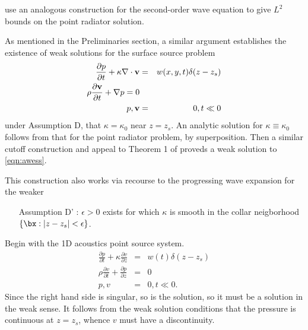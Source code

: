 \cite{SantosaSymes:00} use an analogous construction for the
second-order wave equation to give $L^2$ bounds on the point radiator
solution.

As mentioned in the Preliminaries section, a similar argument
establishes the existence of weak solutions for the surface source problem
\begin{eqnarray}
\label{eqn:awess}
\frac{\partial p}{\partial t} + \kappa \nabla \cdot {\bf v} &=&
                                                                w(x,y,t)\delta(z-z_s) \nonumber\\
\rho \frac{\partial {\bf v}}{\partial t} + \nabla p = 0 \nonumber\\
p,{\bf v}&=&0, t \ll 0
\end{eqnarray}
under Assumption D, that $\kappa=\kappa_0$ near $z=z_s$. An analytic
solution for $\kappa \equiv \kappa_0$ follows from that for the point
radiator problem, by superposition. Then a similar cutoff construction
and appeal to Theorem 1 of \cite{BlazekStolkSymes:13} proveds a weak
solution to \ref{eqn:awess}.

This construction also works via recourse to the progressing wave
expansion for the weaker
\begin{itemize}
\item[Assumption D']: $\epsilon > 0$ exists for which $\kappa$ is
smooth in the collar neigborhood $\{\bx: |z-z_s|<\epsilon\}$.
\end{itemize}
  
Begin with the 1D acoustics point source system. 
\begin{eqnarray}
\label{eqn:awe1dptsrc}
\frac{\partial p}{\partial t} +\kappa\frac{\partial 
  v}{\partial z} &=& w(t)\delta(z-z_s) \nonumber\\
\rho \frac{\partial v}{\partial t} + \frac{\partial p}{\partial 
  z}&=&0\nonumber\\
 p,v&=&0, t \ll 0. 
\end{eqnarray}
Since the right hand side is singular, so is the solution, so it must
be a solution in the weak sense. It follows from the weak solution
conditions that the pressure is continuous at $z=z_s$, whence $v$ must
have a discontinuity. 

